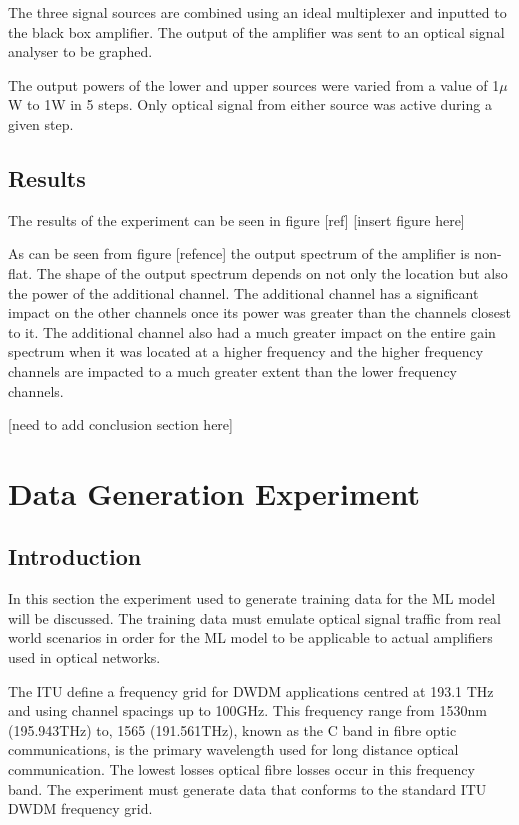 The three signal sources are combined using an ideal multiplexer and inputted to the black box amplifier. The output of the amplifier was sent to an optical signal analyser to be graphed.

The output powers of the lower and upper sources were varied from a value of 1$\mu$W to 1W in 5 steps. Only optical signal from either source was active during a given step.

\subsection{Results}
The results of the experiment can be seen in figure [ref]
[insert figure here]

As can be seen from figure [refence] the output spectrum of the amplifier is non-flat. The shape of the output spectrum depends on not only the location but also the power of the additional channel. The additional channel has a significant impact on the other channels once its power was greater than the channels closest to it. The additional channel also had a much greater impact on the entire gain spectrum when it was located at a higher frequency and the higher frequency channels are impacted to a much greater extent than the lower frequency channels.

[need to add conclusion section here]




\newpage
\section{Data Generation Experiment}
\label{tw:data_gen}

\subsection{Introduction}

In this section  the experiment used to generate training data for the ML model will be discussed. The training data must emulate optical signal traffic from real world scenarios in order for the ML model to be applicable to actual amplifiers used in optical networks.

The ITU define a frequency grid for DWDM applications centred at 193.1 THz and using channel spacings up to 100GHz. This frequency range from 1530nm (195.943THz) to, 1565 (191.561THz), known as the C band in fibre optic communications, is the primary wavelength used for long distance optical communication. The lowest losses optical fibre losses occur in this frequency band. The experiment must generate data that conforms to the standard ITU DWDM frequency grid. 

